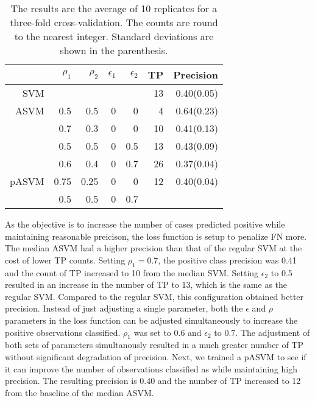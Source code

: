 \documentclass[twoside,11pt]{article}
\begin{document}
\begin{table}[htp]
\centering
\small\begin{tabular}{rrrrr|rr}
\hline
&$\rho_1$ & $\rho_2$ & $\epsilon_1$ & $\epsilon_2$ & TP & Precision \bigstrut\\
\hline
\hline
SVM &       &       &       &       &  13     & 0.40(0.05) \bigstrut[t]\\
\hline
ASVM  & 0.5   & 0.5   & 0     & 0     & 4     & 0.64(0.23) \\
      & 0.7   & 0.3   & 0     & 0     & 10    & 0.41(0.13) \\
      & 0.5   & 0.5   & 0     & 0.5   & 13    & 0.43(0.09) \\
      & 0.6   & 0.4   & 0     & 0.7   & 26    & 0.37(0.04) \bigstrut[b]\\
\hline
pASVM & 0.75  & 0.25  & 0     & 0     & 12    & 0.40(0.04) \bigstrut[t]\\
      & 0.5   & 0.5   & 0     & 0.7   &       &  \bigstrut[b]\\
\hline
\hline
\end{tabular}%
\caption{The results are the average of 10 replicates for a three-fold cross-validation. The counts are round to the nearest integer. Standard deviations are shown in the parenthesis.}
\label{bloodtransfusion}
\end{table}

As the objective is to increase the number of cases predicted positive while maintaining reasonable preicison, the loss function is setup to penalize FN more. The median ASVM had a higher precision than that of the regular SVM at the cost of lower TP counts. Setting $\rho_1=0.7$, the positive class precision was 0.41 and the count of TP increased to 10 from the median SVM. Setting $\epsilon_2$ to 0.5 resulted in an increase in the number of TP to 13, which is the same as the regular SVM. Compared to the regular SVM, this configuration obtained better precision. Instead of just adjusting a single parameter, both the $\epsilon$ and $\rho$ parameters in the loss function can be adjusted simultaneously to increase the positive observations classified. $\rho_1$ was set to 0.6 and $\epsilon_2$ to 0.7. The adjustment of both sets of parameters simultanously resulted in a much greater number of TP without significant degradation of precision. Next, we trained a pASVM to see if it can improve the number of observations classified as while maintaining high precision. The resulting precision is 0.40 and the number of TP increased to 12 from the baseline of the median ASVM.
\end{document}
